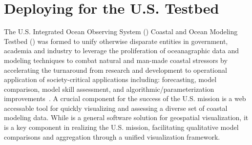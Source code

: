 \section{Deploying \sciwms{} for the U.S. \ioos{} \comt{} Testbed}

The U.S. Integrated Ocean Observing System (\ioos{}) Coastal and Ocean
Modeling Testbed (\comt{}) was formed to unify otherwise disparate
entities in government, academia and industry to leverage the
proliferation of oceanagraphic data and modeling techniques to combat
natural and man-made coastal stressors by accelerating the turnaround
from research and development to operational application of
society-critical applications including: forecasting, model
comparison, model skill assessment, and algorithmic/parameterization
improvements~\cite{luettich13}. A crucial component for the success of
the U.S. \ioos{} \comt{} mission is a web accessable tool for quickly
visualizing and assessing a diverse set of coastal modeling
data. While \sciwms{} is a general software solution for geospatial
visualization, it is a key component in realizing the U.S. \ioos{}
\comt{} mission, facilitating qualitative model comparisons and
aggregation through a unified visualization framework.

